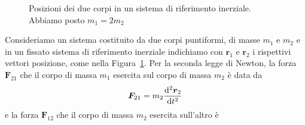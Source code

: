 \begin{figure}
  \centering
  \caption[Posizioni dei due corpi in un sistema di riferimento
  inerziale]{Posizioni dei due corpi in un sistema di riferimento
    inerziale. Abbiamo posto $m_1 = 2 m_2$}
  \label{fig:due-corpi}
\end{figure}
Consideriamo un sistema costituito da due corpi puntiformi, di masse $m_1$ e
$m_2$ e in un fissato sistema di riferimento inerziale indichiamo con $\bm{r}_1$
e $\bm{r}_2$ i rispettivi vettori posizione, come nella
Figura~\ref{fig:due-corpi}. Per la seconda legge di Newton, la forza
$\bm{F}_{21}$ che il corpo di massa $m_1$ esercita sul corpo di massa $m_2$ è
data da
\begin{equation}
  \label{eq:f21}
  \bm{F}_{21} = m_2\toder[2]{\bm{r}_2}{t}
\end{equation}
e la forza $\bm{F}_{12}$ che il corpo di massa $m_2$ esercita sull'altro è
